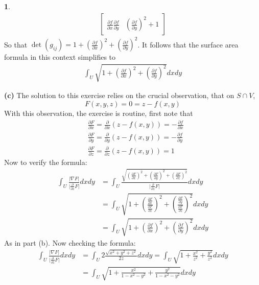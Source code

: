 \documentclass[10.5pt]{article}
\theoremstyle{definition}
\newtheorem{pb}{}
\newcommand{\abs}[1]{\lvert#1\rvert}
\newcommand{\parx}{\frac{\partial}{\partial x}}
\newcommand{\pary}{\frac{\partial}{\partial y}}
\newcommand{\parz}{\frac{\partial}{\partial z}}
\begin{document}
\begin{pb}
\begin{align*}
\begin{bmatrix}
                \frac{\partial f}{\partial x} \frac{\partial f}{\partial y} &
                \left(\frac{\partial f}{\partial y}\right)^2 + 1
             \end{bmatrix}
        \end{align*}
        So that \(\det(g_{ij}) = 1 + \left(\frac{\partial f}{\partial x}\right)^2 + \left( \frac{\partial f}{\partial y}\right)^2\). It follows that the surface area formula in this context simplifies to
        \begin{align*}
            \int_U \sqrt{1 + \left(\frac{\partial f}{\partial x}\right)^2 + \left( \frac{\partial f}{\partial y}\right)^2} dxdy
        \end{align*}

        \textbf{(c)} The solution to this exercise relies on the crucial observation, that on \(S \cap V\), \[F(x,y,z) = 0 = z - f(x,y)\]
        With this observation, the exercise is routine, first note that
        \begin{align*}
            &\frac{\partial F}{\partial x} = \parx (z - f(x,y)) = -\frac{\partial f}{\partial x} \\
            &\frac{\partial F}{\partial y} = \pary (z - f(x,y)) = -\frac{\partial f}{\partial y} \\
            &\frac{\partial F}{\partial z} = \parz (z - f(x,y)) = 1
        \end{align*}
        Now to verify the formula:
        \begin{align*}
            \int_U \frac{\abs{\nabla F}}{\abs{\parz F}}dxdy &= \int_U \frac{\sqrt{\left(\frac{\partial F}{\partial x}\right)^2 + \left(\frac{\partial F}{\partial y}\right)^2 + \left(\frac{\partial F}{\partial z}\right)^2 }}{\abs{\parz F}}dxdy \\
            &= \int_U \sqrt{1 + \left(\frac{\frac{\partial F}{\partial x}}{\frac{\partial F}{\partial z}}\right)^2 + \left(\frac{\frac{\partial F}{\partial y}}{\frac{\partial F}{\partial z}}\right)^2}dxdy \\
            &= \int_U \sqrt{1 + \left(\frac{\partial f}{\partial x}\right)^2 + \left( \frac{\partial f}{\partial y}\right)^2}dxdy
        \end{align*}
        As in part (b). Now checking the formula:
        \begin{align*}
            \int_U \frac{\abs{\nabla F}}{\abs{\parz F}}dxdy &= \int_U 2\frac{\sqrt{x^2 + y^2 + z^2}}{2z}dxdy = \int_U \sqrt{1 + \frac{x^2}{z^2} + \frac{y^2}{z^2}}dxdy \\
            &= \int_U \sqrt{1 + \frac{x^2}{1-x^2-y^2} + \frac{y^2}{1-x^2-y^2}}dxdy \\

\end{align*}
\end{pb}
\end{document}
